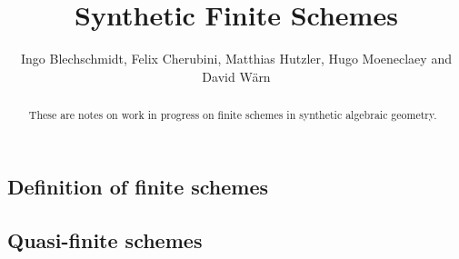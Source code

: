 \documentclass{../util/zariski-small}
\title{Synthetic Finite Schemes}
\theoremstyle{break}
\begin{document}
\author{Ingo Blechschmidt, Felix Cherubini, Matthias Hutzler, Hugo Moeneclaey and David Wärn}

\maketitle

\begin{abstract}
  These are notes on work in progress on finite schemes in synthetic algebraic geometry.
\end{abstract} 

\subsection{Definition of finite schemes}


\subsection{Quasi-finite schemes}


\printindex

\printbibliography
\end{document}
